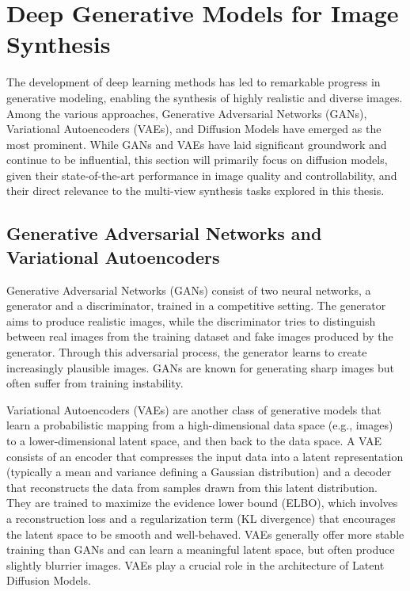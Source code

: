 \section{Deep Generative Models for Image Synthesis}\label{sec:text-to-image}

The development of deep learning methods has led to remarkable progress in generative modeling, enabling the synthesis of highly realistic and diverse images. Among the various approaches, Generative Adversarial Networks (GANs), Variational Autoencoders (VAEs), and Diffusion Models have emerged as the most prominent. While GANs and VAEs have laid significant groundwork and continue to be influential, this section will primarily focus on diffusion models, given their state-of-the-art performance in image quality and controllability, and their direct relevance to the multi-view synthesis tasks explored in this thesis.

\subsection{Generative Adversarial Networks and Variational Autoencoders}

Generative Adversarial Networks (GANs) \cite{gan} consist of two neural networks, a generator and a discriminator, trained in a competitive setting. The generator aims to produce realistic images, while the discriminator tries to distinguish between real images from the training dataset and fake images produced by the generator. Through this adversarial process, the generator learns to create increasingly plausible images. GANs are known for generating sharp images but often suffer from training instability.

Variational Autoencoders (VAEs) \cite{vae} are another class of generative models that learn a probabilistic mapping from a high-dimensional data space (e.g., images) to a lower-dimensional latent space, and then back to the data space. A VAE consists of an encoder that compresses the input data into a latent representation (typically a mean and variance defining a Gaussian distribution) and a decoder that reconstructs the data from samples drawn from this latent distribution. They are trained to maximize the evidence lower bound (ELBO), which involves a reconstruction loss and a regularization term (KL divergence) that encourages the latent space to be smooth and well-behaved. VAEs generally offer more stable training than GANs and can learn a meaningful latent space, but often produce slightly blurrier images. VAEs play a crucial role in the architecture of Latent Diffusion Models.

